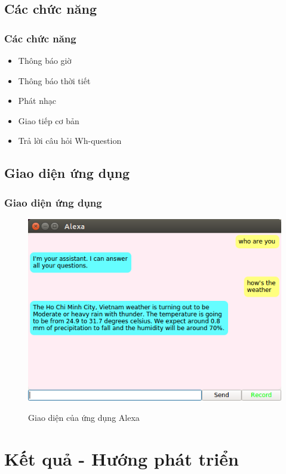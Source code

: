 \documentclass{beamer}
\begin{document}
\subsection{Các chức năng}
\begin{frame}
\frametitle{Các chức năng}
\begin{itemize}
    \item Thông báo giờ
    \item Thông báo thời tiết
    \item Phát nhạc
    \item Giao tiếp cơ bản
    \item Trả lời câu hỏi Wh-question
\end{itemize}
\end{frame}

\subsection{Giao diện ứng dụng}
\begin{frame}
\frametitle{Giao diện ứng dụng}
\begin{figure}
\centering
\href{Demo.mkv}{\includegraphics[scale=0.45]{interface}}
\caption{Giao diện của ứng dụng Alexa}
\end{figure}
\end{frame}

\section{Kết quả - Hướng phát triển}
\end{document}
